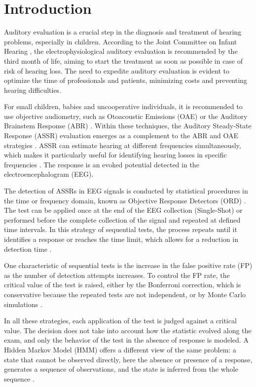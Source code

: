 \documentclass[conference]{IEEEtran}
\begin{document}
\section{Introduction}

Auditory evaluation is a crucial step in the diagnosis and treatment of hearing problems, especially in children. According to the Joint Committee on Infant Hearing \cite{jcih2007}, the electrophysiological auditory evaluation is recommended by the third month of life, aiming to start the treatment as soon as possible in case of risk of hearing loss. The need to expedite auditory evaluation is evident to optimize the time of professionals and patients, minimizing costs and preventing hearing difficulties.

For small children, babies and uncooperative individuals, it is recommended to use objective audiometry, such as Otoacoustic Emissions (OAE) or the Auditory Brainstem Response (ABR) \cite{picton2003}. Within these techniques, the Auditory Steady-State Response (ASSR) evaluation emerges as a complement to the ABR and OAE strategies \cite{sturzebecher1999}. ASSR can estimate hearing at different frequencies simultaneously, which makes it particularly useful for identifying hearing losses in specific frequencies \cite{sininger2018}. The response is an evoked potential detected in the electroencephalogram (EEG).

The detection of ASSRs in EEG signals is conducted by statistical procedures in the time or frequency domain, known as Objective Response Detectors (ORD) \cite{sturzebecher1999}. The test can be applied once at the end of the EEG collection (Single-Shot) or performed before the complete collection of the signal and repeated at defined time intervals. In this strategy of sequential tests, the process repeats until it identifies a response or reaches the time limit, which allows for a reduction in detection time \cite{zanotelli2020,vaz2024,cebulla2015,chesnaye2020}.

One characteristic of sequential tests is the increase in the false positive rate (FP) as the number of detection attempts increases. To control the FP rate, the critical value of the test is raised, either by the Bonferroni correction, which is conservative because the repeated tests are not independent, or by Monte Carlo simulations \cite{sturzebecher2005}.

In all these strategies, each application of the test is judged against a critical value. The decision does not take into account how the statistic evolved along the exam, and only the behavior of the test in the absence of response is modeled. A Hidden Markov Model (HMM) offers a different view of the same problem: a state that cannot be observed directly, here the absence or presence of a response, generates a sequence of observations, and the state is inferred from the whole sequence \cite{rabiner1989}.
\end{document}
